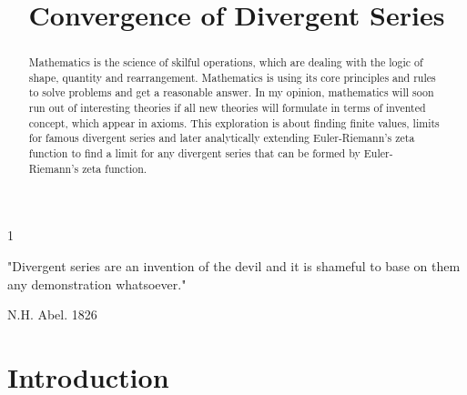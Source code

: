 1\documentclass[a4paper]{article}
\title{Convergence of Divergent Series}
\date{}
\author{}
\begin{document}
\maketitle
\tableofcontents
\listoffigures
\listoftables
\newpage

 \begin{center}
 "Divergent series are an invention of the devil and it is shameful
to base on them any demonstration whatsoever."\cite{Abel}
 \end{center}
 \begin{flushright}
   N.H. Abel. 1826
   \end{flushright}


\begin{abstract}
    Mathematics is the science of skilful operations, which are dealing with the logic of shape, quantity
and rearrangement. Mathematics is using its core principles and rules to solve problems and get a
reasonable answer. In my opinion, mathematics will soon run out of interesting theories if all new
theories will formulate in terms of invented concept, which appear in axioms. This exploration is
about finding finite values, limits for famous divergent series and later analytically extending
Euler-Riemann's zeta function to find a limit for any divergent series that can be formed by Euler-
Riemann's zeta function.
\end{abstract}

\section{Introduction}
\end{document}
